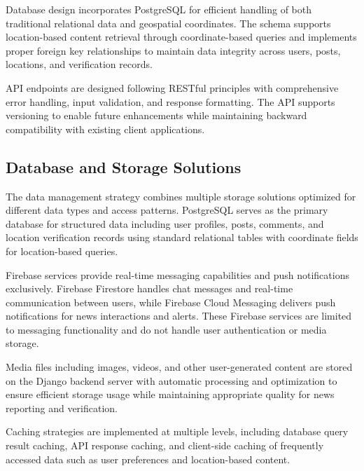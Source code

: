 Database design incorporates PostgreSQL for efficient handling of both traditional relational data and geospatial coordinates. The schema supports location-based content retrieval through coordinate-based queries and implements proper foreign key relationships to maintain data integrity across users, posts, locations, and verification records.

API endpoints are designed following RESTful principles with comprehensive error handling, input validation, and response formatting. The API supports versioning to enable future enhancements while maintaining backward compatibility with existing client applications.

\subsection{Database and Storage Solutions}
\label{subsec:database-storage}

The data management strategy combines multiple storage solutions optimized for different data types and access patterns. PostgreSQL serves as the primary database for structured data including user profiles, posts, comments, and location verification records using standard relational tables with coordinate fields for location-based queries.

Firebase services provide real-time messaging capabilities and push notifications exclusively. Firebase Firestore handles chat messages and real-time communication between users, while Firebase Cloud Messaging delivers push notifications for news interactions and alerts. These Firebase services are limited to messaging functionality and do not handle user authentication or media storage.

Media files including images, videos, and other user-generated content are stored on the Django backend server with automatic processing and optimization to ensure efficient storage usage while maintaining appropriate quality for news reporting and verification.

Caching strategies are implemented at multiple levels, including database query result caching, API response caching, and client-side caching of frequently accessed data such as user preferences and location-based content.

